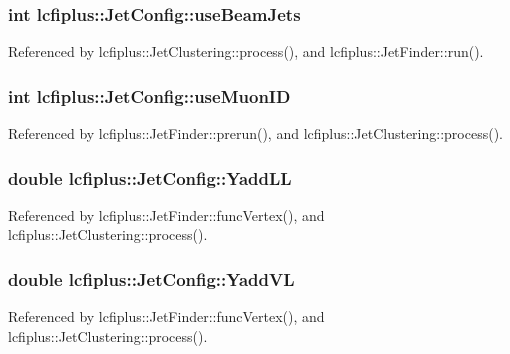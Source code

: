 \subsubsection[{use\-Beam\-Jets}]{\setlength{\rightskip}{0pt plus 5cm}int lcfiplus\-::\-Jet\-Config\-::use\-Beam\-Jets}\label{structlcfiplus_1_1JetConfig_a489551d988283323d47c6e5b71b6f6dc}


Referenced by lcfiplus\-::\-Jet\-Clustering\-::process(), and lcfiplus\-::\-Jet\-Finder\-::run().

\subsubsection[{use\-Muon\-I\-D}]{\setlength{\rightskip}{0pt plus 5cm}int lcfiplus\-::\-Jet\-Config\-::use\-Muon\-I\-D}\label{structlcfiplus_1_1JetConfig_a9dfb6be88b4005fd63d355cbf364f5db}


Referenced by lcfiplus\-::\-Jet\-Finder\-::prerun(), and lcfiplus\-::\-Jet\-Clustering\-::process().

\subsubsection[{Yadd\-L\-L}]{\setlength{\rightskip}{0pt plus 5cm}double lcfiplus\-::\-Jet\-Config\-::\-Yadd\-L\-L}\label{structlcfiplus_1_1JetConfig_a2bcd351e8c1946190e717a1a341b5b6d}


Referenced by lcfiplus\-::\-Jet\-Finder\-::func\-Vertex(), and lcfiplus\-::\-Jet\-Clustering\-::process().

\subsubsection[{Yadd\-V\-L}]{\setlength{\rightskip}{0pt plus 5cm}double lcfiplus\-::\-Jet\-Config\-::\-Yadd\-V\-L}\label{structlcfiplus_1_1JetConfig_a81dc48c9e893048e4798a01d0a3f00d2}


Referenced by lcfiplus\-::\-Jet\-Finder\-::func\-Vertex(), and lcfiplus\-::\-Jet\-Clustering\-::process().

